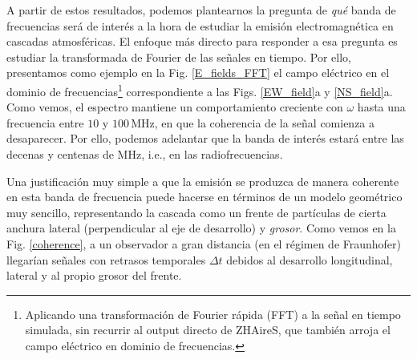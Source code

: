 \documentclass[11 pt, a4paper]{article} %
\numberwithin{equation}{section}
\numberwithin{figure}{section}
\numberwithin{table}{section}
\begin{document}
A partir de estos resultados, podemos plantearnos la pregunta de \textit{qué} banda de frecuencias será de interés a la hora de estudiar la emisión electromagnética en cascadas atmosféricas. El enfoque más directo para responder a esa pregunta es estudiar la transformada de Fourier de las señales en tiempo. Por ello, presentamos como ejemplo en la Fig. \ref{E_fields_FFT} el campo eléctrico en el dominio de frecuencias\footnote{ Aplicando una transformación de Fourier rápida (FFT) a la señal en tiempo simulada, sin recurrir al output directo de ZHAireS, que también arroja el campo eléctrico en dominio de frecuencias.} correspondiente a las Figs. \ref{EW_field}a y \ref{NS_field}a. Como vemos, el espectro mantiene un comportamiento creciente con $\omega$ hasta una frecuencia entre $10$ y $100\,\mathrm{MHz}$, en que la coherencia de la señal comienza a desaparecer. Por ello, podemos adelantar que la banda de interés estará entre las decenas y centenas de $\mathrm{MHz}$, i.e., en las radiofrecuencias. 

Una justificación muy simple a que la emisión se produzca de manera coherente en esta banda de frecuencia puede hacerse en términos de un modelo geométrico muy sencillo, representando la cascada como un frente de partículas de cierta anchura lateral (perpendicular al eje de desarrollo) y \textit{grosor}. Como vemos en la Fig. \ref{coherence}, a un observador a gran distancia (en el régimen de Fraunhofer) llegarían señales con retrasos temporales $\Delta t$ debidos al desarrollo longitudinal, lateral y al propio grosor del frente.
\end{document}

